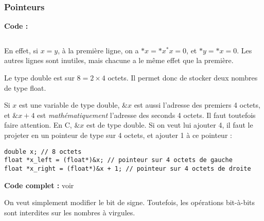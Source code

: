\documentclass[../main.tex]{subfiles}
\begin{document}
\subsubsection{Pointeurs}

\textbf{Code :} 

\inputminted{c}{solutions/part2/chapter2/inter_no_side_effect_3.c}
En effet, si $x = y$, à la première ligne, on a $*x = *x ^ *x = 0$, et $*y = *x = 0$. Les autres lignes sont inutiles, mais chacune a le même effet que la première.

Le type \textsf{double} est sur $8 = 2\times{4}$ octets. Il permet donc de stocker deux nombres de type \textsf{float}.

Si $x$ est une variable de type \textsf{double}, $\&x$ est aussi l'adresse des premiers 4 octets, et $\&x + 4$ est \textit{mathématiquement} l'adresse des seconds 4 octets. Il faut toutefois faire attention. En C, $\&x$ est de type \textsf{double}. Si on veut lui ajouter 4, il faut le projeter en un pointeur de type sur 4 octets, et ajouter 1 à ce pointeur :
\begin{verbatim}
double x; // 8 octets
float *x_left = (float*)&x; // pointeur sur 4 octets de gauche
float *x_right = (float*)&x + 1; // pointeur sur 4 octets de droite
\end{verbatim}
\textbf{Code complet :} voir 

On veut simplement modifier le bit de signe. Toutefois, les opérations bit-à-bits sont interdites sur les nombres à virgules.
\end{document}
